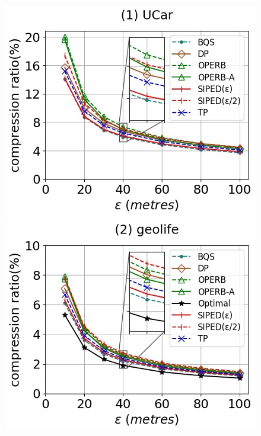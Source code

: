 \begin{figure}[tb!]
	\centering
	\includegraphics[scale=0.250]{Figures/Exp-PED-CR-epsilon-service.jpg} 	\hspace{0.5ex}
	\includegraphics[scale=0.250]{Figures/Exp-PED-CR-epsilon-geolife.jpg}	\hspace{0.5ex}

\end{figure}
